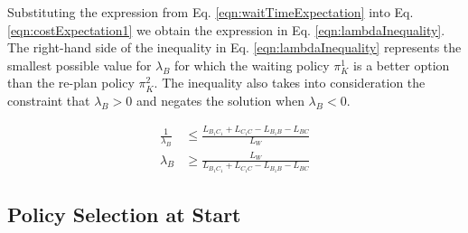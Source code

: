 \documentclass[a4paper,12pt]{article}
\begin{document}
			Substituting the expression from Eq. \ref{eqn:waitTimeExpectation} into Eq. \ref{eqn:costExpectation1} we obtain the expression in Eq. \ref{eqn:lambdaInequality}. The right-hand side of the inequality in Eq. \ref{eqn:lambdaInequality} represents the smallest possible value for $\lambda_{B}$ for which the waiting policy $\pi_K^1$ is a better option than the re-plan policy $\pi_K^2$. The inequality also takes into consideration the constraint that $\lambda_{B} > 0$ and negates the solution when $\lambda_{B} < 0$.

			\begin{equation}
				\begin{split}
					\frac{1}{\lambda_{B}} & \leq \frac{L_{B_{1}C_{1}} + L_{C_{1}C} - L_{B_{1}B} - L_{BC}}{L_W} \\	
					\lambda_{B} & \geq \frac{L_W}{L_{B_{1}C_{1}} + L_{C_{1}C} - L_{B_{1}B} - L_{BC}}
				\end{split}
				\label{eqn:lambdaInequality}
			\end{equation}

		\subsection{Policy Selection at Start}
		\label{sec:policySelectionAtStart}
		
\end{document}
